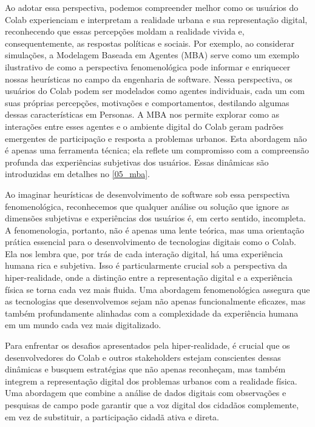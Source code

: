 Ao adotar essa perspectiva, podemos compreender melhor como os usuários do Colab experienciam e interpretam a realidade urbana e sua representação digital, reconhecendo que essas percepções moldam a realidade vivida e, consequentemente, as respostas políticas e sociais. Por exemplo, ao considerar simulações, a Modelagem Baseada em Agentes (MBA) serve como um exemplo ilustrativo de como a perspectiva fenomenológica pode informar e enriquecer nossas heurísticas no campo da engenharia de software. Nessa perspectiva, os usuários do Colab podem ser modelados como agentes individuais, cada um com suas próprias percepções, motivações e comportamentos, destilando algumas dessas características em Personas. A MBA nos permite explorar como as interações entre esses agentes e o ambiente digital do Colab geram padrões emergentes de participação e resposta a problemas urbanos. Esta abordagem não é apenas uma ferramenta técnica; ela reflete um compromisso com a compreensão profunda das experiências subjetivas dos usuários. Essas dinâmicas são introduzidas em detalhes no \autoref{05_mba}.

Ao imaginar heurísticas de desenvolvimento de software sob essa perspectiva fenomenológica, reconhecemos que qualquer análise ou solução que ignore as dimensões subjetivas e experiências dos usuários é, em certo sentido, incompleta. A fenomenologia, portanto, não é apenas uma lente teórica, mas uma orientação prática essencial para o desenvolvimento de tecnologias digitais como o Colab. Ela nos lembra que, por trás de cada interação digital, há uma experiência humana rica e subjetiva. Isso é particularmente crucial sob a perspectiva da hiper-realidade, onde a distinção entre a representação digital e a experiência física se torna cada vez mais fluida. Uma abordagem fenomenológica assegura que as tecnologias que desenvolvemos sejam não apenas funcionalmente eficazes, mas também profundamente alinhadas com a complexidade da experiência humana em um mundo cada vez mais digitalizado.

Para enfrentar os desafios apresentados pela hiper-realidade, é crucial que os desenvolvedores do Colab e outros stakeholders estejam conscientes dessas dinâmicas e busquem estratégias que não apenas reconheçam, mas também integrem a representação digital dos problemas urbanos com a realidade física. Uma abordagem que combine a análise de dados digitais com observações e pesquisas de campo pode garantir que a voz digital dos cidadãos complemente, em vez de substituir, a participação cidadã ativa e direta.

